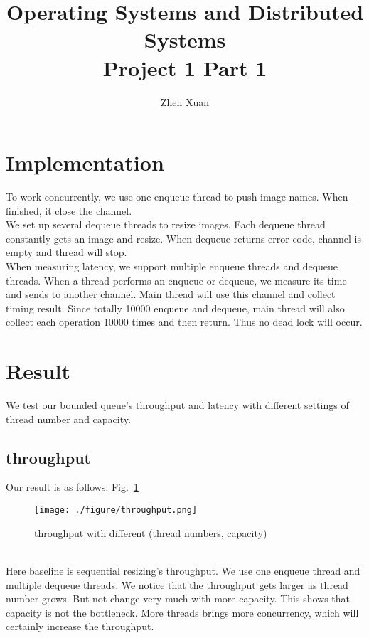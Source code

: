 \documentclass[12pt,a4paper]{article}
\title{Operating Systems and Distributed Systems\\Project 1 Part 1}
\author{Zhen Xuan}
\begin{document}
\maketitle

\section{Implementation}
To work concurrently, we use one enqueue thread to push image names. When finished,
it close the channel.\\
We set up several dequeue threads to resize images. Each dequeue thread constantly gets
an image and resize. When dequeue returns error code, channel is empty and thread will
stop.\\
When measuring latency, we support multiple enqueue threads and dequeue threads.
When a thread performs an enqueue or dequeue, we measure its time and sends to another
channel. Main thread will use this channel and collect timing result. Since totally 10000
enqueue and dequeue, main thread will also collect each operation 10000 times and then
return. Thus no dead lock will occur.
\section{Result}
We test our bounded queue's throughput and latency with different settings
of thread number and capacity.
\subsection{throughput}
Our result is as follows: Fig.~\ref{throughput}
\begin{figure}[htbp!]
    \begin{center}
        \texttt{[image: ./figure/throughput.png]}
    \end{center}
    \caption{
        throughput with different (thread numbers, capacity)
    }
    \label{throughput}
\end{figure}\\
Here baseline is sequential resizing’s throughput. We use one enqueue thread and multiple
dequeue threads. We notice that the throughput gets larger as thread number grows. But
not change very much with more capacity. This shows that capacity is not the bottleneck.
More threads brings more concurrency, which will certainly increase the throughput.
\end{document}
